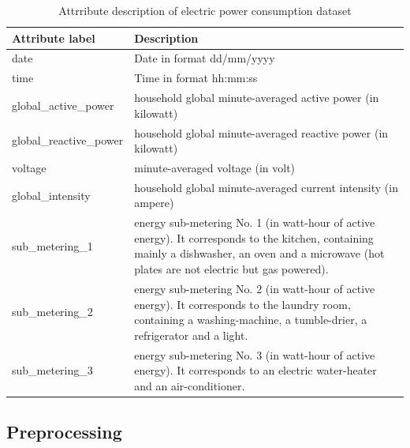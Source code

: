 \begin{table}[p]
	\begin{center}
		\begin{tabular}{|p{4cm}|p{10cm}|}
			\hline	{\bf Attribute label}&{ \bf Description}\\
\hline date &   Date in format dd/mm/yyyy\\\hline
time &  	Time in format hh:mm:ss  \\\hline 
global\_active\_power & household global minute-averaged active power (in
kilowatt)  \\
\hline global\_reactive\_power & household global minute-averaged reactive power
(in kilowatt)  \\
\hline voltage & minute-averaged voltage (in volt)  \\
\hline global\_intensity & household global minute-averaged current intensity
(in ampere)  \\
\hline sub\_metering\_1 & energy sub-metering No. 1 (in watt-hour of active
energy). It corresponds to the kitchen, containing mainly a dishwasher, 
an oven and a microwave (hot plates are not electric but gas powered).  \\
\hline sub\_metering\_2 & energy sub-metering No. 2 (in watt-hour of active
energy). It corresponds to the laundry room, containing a washing-machine, a tumble-drier, a refrigerator and a light.  \\
\hline sub\_metering\_3 & energy sub-metering No. 3 (in watt-hour of active 
energy). It corresponds to an electric water-heater and an air-conditioner.
\\\hline
\end{tabular}
\end{center}
\caption{Attrribute description of electric power consumption
dataset}
\label{ypmsd:table:ds3attributes}
\end{table}





\subsection{Preprocessing\label{ds3:Preprocessing}}

